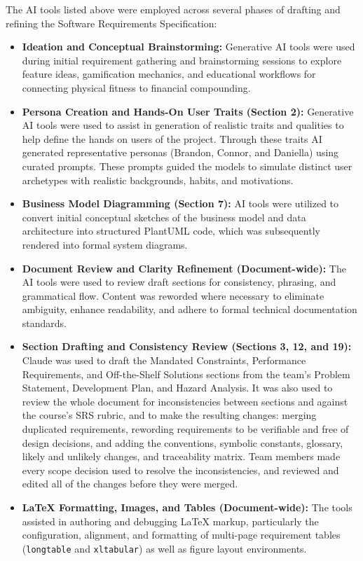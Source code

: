 \documentclass[12pt]{article}
\begin{document}
The AI tools listed above were employed across several phases of drafting and
refining the Software Requirements Specification:
\begin{itemize}
    \item \textbf{Ideation and Conceptual Brainstorming:} Generative AI tools were used during initial requirement gathering
    and brainstorming sessions to explore feature ideas, gamification mechanics,
    and educational workflows for connecting physical fitness to financial
    compounding.
    \item \textbf{Persona Creation and Hands-On User Traits (Section 2):} Generative AI tools were used to assist in generation of realistic traits and qualities to help define the hands on users of the project. Through these traits AI generated representative personas (Brandon, Connor, and Daniella)
    using curated prompts. These prompts guided the models to simulate
    distinct user archetypes with realistic backgrounds, habits, and motivations. 
    \item \textbf{Business Model Diagramming (Section 7):} AI tools were
    utilized to convert initial conceptual sketches of the business model and
    data architecture into structured PlantUML code, which was subsequently
    rendered into formal system diagrams.
    \item \textbf{Document Review and Clarity Refinement (Document-wide):} The
    AI tools were used to review draft sections for consistency, phrasing, and
    grammatical flow. Content was reworded where necessary to eliminate
    ambiguity, enhance readability, and adhere to formal technical documentation
    standards.
    \item \textbf{Section Drafting and Consistency Review (Sections 3, 12,
    and 19):} Claude was used to draft the Mandated Constraints, Performance
    Requirements, and Off-the-Shelf Solutions sections from the team's
    Problem Statement, Development Plan, and Hazard Analysis. It was also used
    to review the whole document for inconsistencies between sections and
    against the course's SRS rubric, and to make the resulting changes: merging
    duplicated requirements, rewording requirements to be verifiable and free
    of design decisions, and adding the conventions, symbolic constants,
    glossary, likely and unlikely changes, and traceability matrix. Team
    members made every scope decision used to resolve the inconsistencies, and
    reviewed and edited all of the changes before they were merged.
    \item \textbf{LaTeX Formatting, Images, and Tables (Document-wide):} The
    tools assisted in authoring and debugging LaTeX markup, particularly the
    configuration, alignment, and formatting of multi-page requirement tables
    (\texttt{longtable} and \texttt{xltabular}) as well as figure layout
    environments.
\end{itemize}
\end{document}
